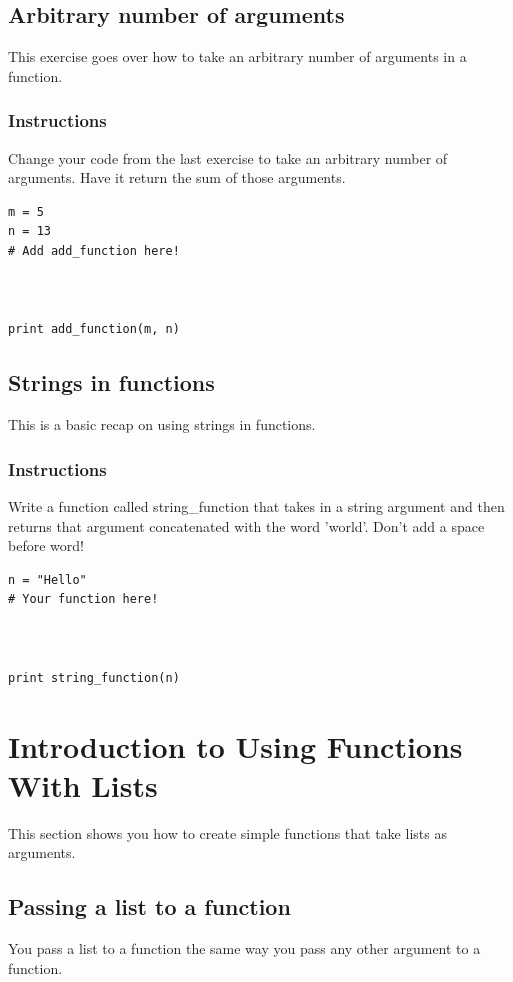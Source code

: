 \documentclass[12pt,a4paper,final,twoside,onecolumn,titlepage]{book}
\begin{document}
\subsection{Arbitrary number of arguments}

This exercise goes over how to take an arbitrary number of arguments in a function.
\subsubsection{Instructions}

Change your code from the last exercise to take an arbitrary number of arguments. Have it return the sum of those arguments.
\begin{lstlisting}
m = 5
n = 13
# Add add_function here!



print add_function(m, n)
\end{lstlisting}

\subsection{Strings in functions}

This is a basic recap on using strings in functions.
\subsubsection{Instructions}

Write a function called string\_function that takes in a string argument and then returns that argument concatenated with the word 'world'. Don't add a space before word!
\begin{lstlisting}
n = "Hello"
# Your function here!



print string_function(n)
\end{lstlisting}

\section{Introduction to Using Functions With Lists}
This section shows you how to create simple functions that take lists as arguments.
\subsection{Passing a list to a function}

You pass a list to a function the same way you pass any other argument to a function.
\end{document}
